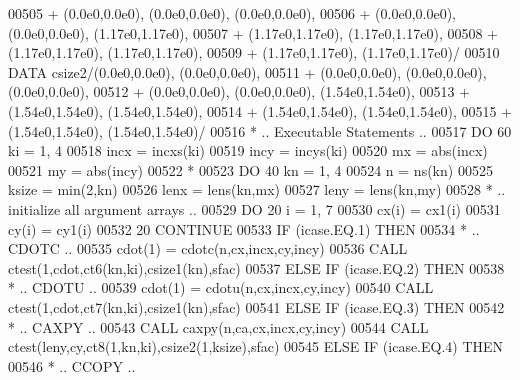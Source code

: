 \begin{DoxyCode}
00505      +                  (0.0e0,0.0e0), (0.0e0,0.0e0), (0.0e0,0.0e0),
00506      +                  (0.0e0,0.0e0), (0.0e0,0.0e0), (1.17e0,1.17e0),
00507      +                  (1.17e0,1.17e0), (1.17e0,1.17e0),
00508      +                  (1.17e0,1.17e0), (1.17e0,1.17e0),
00509      +                  (1.17e0,1.17e0), (1.17e0,1.17e0)/
00510       \textcolor{keyword}{DATA}              csize2/(0.0e0,0.0e0), (0.0e0,0.0e0),
00511      +                  (0.0e0,0.0e0), (0.0e0,0.0e0), (0.0e0,0.0e0),
00512      +                  (0.0e0,0.0e0), (0.0e0,0.0e0), (1.54e0,1.54e0),
00513      +                  (1.54e0,1.54e0), (1.54e0,1.54e0),
00514      +                  (1.54e0,1.54e0), (1.54e0,1.54e0),
00515      +                  (1.54e0,1.54e0), (1.54e0,1.54e0)/
00516 \textcolor{comment}{*     .. Executable Statements ..}
00517       \textcolor{keywordflow}{DO} 60 ki = 1, 4
00518          incx = incxs(ki)
00519          incy = incys(ki)
00520          mx = abs(incx)
00521          my = abs(incy)
00522 \textcolor{comment}{*}
00523          \textcolor{keywordflow}{DO} 40 kn = 1, 4
00524             n = ns(kn)
00525             ksize = min(2,kn)
00526             lenx = lens(kn,mx)
00527             leny = lens(kn,my)
00528 \textcolor{comment}{*           .. initialize all argument arrays ..}
00529             \textcolor{keywordflow}{DO} 20 i = 1, 7
00530                cx(i) = cx1(i)
00531                cy(i) = cy1(i)
00532    20       \textcolor{keywordflow}{CONTINUE}
00533             \textcolor{keywordflow}{IF} (icase.EQ.1) \textcolor{keywordflow}{THEN}
00534 \textcolor{comment}{*              .. CDOTC ..}
00535                cdot(1) = cdotc(n,cx,incx,cy,incy)
00536                \textcolor{keyword}{CALL }ctest(1,cdot,ct6(kn,ki),csize1(kn),sfac)
00537             \textcolor{keywordflow}{ELSE} \textcolor{keywordflow}{IF} (icase.EQ.2) \textcolor{keywordflow}{THEN}
00538 \textcolor{comment}{*              .. CDOTU ..}
00539                cdot(1) = cdotu(n,cx,incx,cy,incy)
00540                \textcolor{keyword}{CALL }ctest(1,cdot,ct7(kn,ki),csize1(kn),sfac)
00541             \textcolor{keywordflow}{ELSE} \textcolor{keywordflow}{IF} (icase.EQ.3) \textcolor{keywordflow}{THEN}
00542 \textcolor{comment}{*              .. CAXPY ..}
00543                \textcolor{keyword}{CALL }caxpy(n,ca,cx,incx,cy,incy)
00544                \textcolor{keyword}{CALL }ctest(leny,cy,ct8(1,kn,ki),csize2(1,ksize),sfac)
00545             \textcolor{keywordflow}{ELSE} \textcolor{keywordflow}{IF} (icase.EQ.4) \textcolor{keywordflow}{THEN}
00546 \textcolor{comment}{*              .. CCOPY ..}

\end{DoxyCode}

